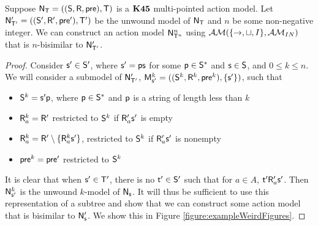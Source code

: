\begin{lemma} \label{lemma:unwoundModelBisimilarConstruct}
  Suppose $\evM_\evT = ((\evS,\evR,\evpr),\evT)$ is a $\AXKFF$ multi-pointed
  action model.
	Let $\evM'_{\evT'} = ((\evS',\evR',\evpr'),\evT')$ be the unwound model of
  $\evM_\evT$ and $n$ be some non-negative integer.
	We can construct an action model $\evM^{n}_{\evT^{n}}$ using $\EM(\{\to,\sqcup,I\},
\insaneClass)$ that is $n$-bisimilar to
  $\evM'_{\evT'}$.
\end{lemma}
\begin{proof}
	Consider $\evs' \in \evS'$, where $\evs' = \evp \evs$ for some $\evp \in \evS^\ast$ and $\evs \in
	\evS$, and $0 \leq k \leq n$.
	We will consider a submodel of $\evM'_{\evT'}$, $\evMM^k_{\evs'} =
	((\evS^k,\evR^k,\evpr^k),\{\evs'\})$, such that
	\begin{itemize}
		\item $\evS^k = \evs' \evp$, where $\evp \in \evS^\ast$ and $\evp$ is a string of length less
			than $k$
		\item $\evR^k_a = \evR'$ restricted to $\evS^k$ if $\evR'_a \evs'$ is empty
		\item $\evR^k_a = \evR' \setminus \{\evR^k_a \evs'\}$,
    restricted to $\evS^k$ if $\evR'_a \evs'$ is nonempty
		\item $\evpr^k = \evpr'$ restricted to $\evS^k$
	\end{itemize}

	It is clear that when $\evs' \in \evT'$, there is no $\evt' \in \evS'$ such
  that for $a \in A$, $\evt' \evR'_a \evs'$.
  Then $\evM^k_{\evs'}$ is the unwound $k$-model of $\evM_\evs$.
	It will thus be sufficient to use this representation of a subtree and show that we can construct
	some action model that is bisimilar to $\evM'_\evs$.
	We show this in Figure \ref{figure:exampleWeirdFigures}.


\end{proof}

